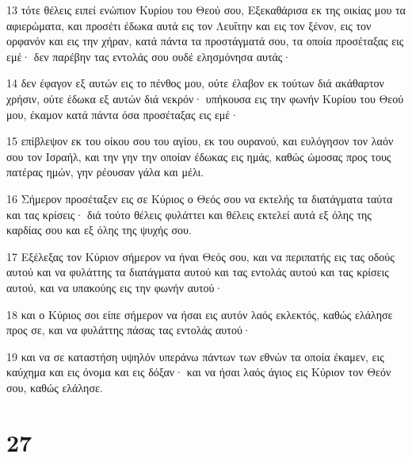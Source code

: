 \par 13 τότε θέλεις ειπεί ενώπιον Κυρίου του Θεού σου, Εξεκαθάρισα εκ της οικίας μου τα αφιερώματα, και προσέτι έδωκα αυτά εις τον Λευΐτην και εις τον ξένον, εις τον ορφανόν και εις την χήραν, κατά πάντα τα προστάγματά σου, τα οποία προσέταξας εις εμέ· δεν παρέβην τας εντολάς σου ουδέ ελησμόνησα αυτάς·
\par 14 δεν έφαγον εξ αυτών εις το πένθος μου, ούτε έλαβον εκ τούτων διά ακάθαρτον χρήσιν, ούτε έδωκα εξ αυτών διά νεκρόν· υπήκουσα εις την φωνήν Κυρίου του Θεού μου, έκαμον κατά πάντα όσα προσέταξας εις εμέ·
\par 15 επίβλεψον εκ του οίκου σου του αγίου, εκ του ουρανού, και ευλόγησον τον λαόν σου τον Ισραήλ, και την γην την οποίαν έδωκας εις ημάς, καθώς ώμοσας προς τους πατέρας ημών, γην ρέουσαν γάλα και μέλι.
\par 16 Σήμερον προσέταξεν εις σε Κύριος ο Θεός σου να εκτελής τα διατάγματα ταύτα και τας κρίσεις· διά τούτο θέλεις φυλάττει και θέλεις εκτελεί αυτά εξ όλης της καρδίας σου και εξ όλης της ψυχής σου.
\par 17 Εξέλεξας τον Κύριον σήμερον να ήναι Θεός σου, και να περιπατής εις τας οδούς αυτού και να φυλάττης τα διατάγματα αυτού και τας εντολάς αυτού και τας κρίσεις αυτού, και να υπακούης εις την φωνήν αυτού·
\par 18 και ο Κύριος σοι είπε σήμερον να ήσαι εις αυτόν λαός εκλεκτός, καθώς ελάλησε προς σε, και να φυλάττης πάσας τας εντολάς αυτού·
\par 19 και να σε καταστήση υψηλόν υπεράνω πάντων των εθνών τα οποία έκαμεν, εις καύχημα και εις όνομα και εις δόξαν· και να ήσαι λαός άγιος εις Κύριον τον Θεόν σου, καθώς ελάλησε.

\chapter{27}

